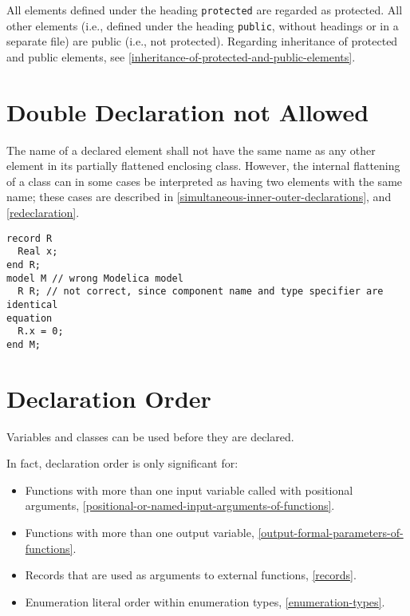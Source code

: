 All elements defined under the heading \lstinline!protected! are regarded as protected.  All other elements (i.e., defined
under the heading \lstinline!public!, without headings or in a separate file) are public (i.e., not protected).  Regarding
inheritance of protected and public elements, see \cref{inheritance-of-protected-and-public-elements}.


\section{Double Declaration not Allowed}\label{double-declaration-not-allowed}

The name of a declared element shall not have the same name as any other
element in its partially flattened enclosing class. However, the internal
flattening of a class can in some cases be interpreted as having two
elements with the same name; these cases are described in \cref{simultaneous-inner-outer-declarations},
and \cref{redeclaration}.

\begin{example}
\begin{lstlisting}[language=modelica]
record R
  Real x;
end R;
model M // wrong Modelica model
  R R; // not correct, since component name and type specifier are identical
equation
  R.x = 0;
end M;
\end{lstlisting}
\end{example}

\section{Declaration Order}\label{declaration-order}\label{declaration-order-and-usage-before-declaration}

Variables and classes can be used before they are declared.

\begin{nonnormative}
In fact, declaration order is only significant for:
\begin{itemize}
\item
  Functions with more than one input variable called with positional arguments, \cref{positional-or-named-input-arguments-of-functions}.
\item
  Functions with more than one output variable, \cref{output-formal-parameters-of-functions}.
\item
  Records that are used as arguments to external functions, \cref{records}.
\item
  Enumeration literal order within enumeration types, \cref{enumeration-types}.
\end{itemize}
\end{nonnormative}

